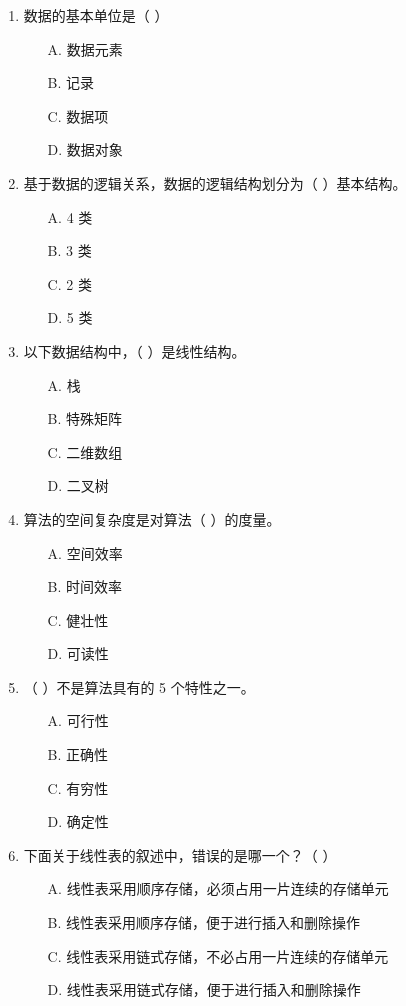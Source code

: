 \documentclass[12pt, a4paper]{article}
\begin{document}
\begin{enumerate}[label=\arabic*.]
	\item 数据的基本单位是（ ）
	      \begin{enumerate}
		      \item[A.] 数据元素
		      \item[B.] 记录
		      \item[C.] 数据项
		      \item[D.] 数据对象
	      \end{enumerate}

	\item 基于数据的逻辑关系，数据的逻辑结构划分为（ ）基本结构。
	      \begin{enumerate}
		      \item[A.] 4 类
		      \item[B.] 3 类
		      \item[C.] 2 类
		      \item[D.] 5 类
	      \end{enumerate}

	\item 以下数据结构中，（ ）是线性结构。
	      \begin{enumerate}
		      \item[A.] 栈
		      \item[B.] 特殊矩阵
		      \item[C.] 二维数组
		      \item[D.] 二叉树
	      \end{enumerate}

	\item 算法的空间复杂度是对算法（ ）的度量。
	      \begin{enumerate}
		      \item[A.] 空间效率
		      \item[B.] 时间效率
		      \item[C.] 健壮性
		      \item[D.] 可读性
	      \end{enumerate}

	\item （ ）不是算法具有的 5 个特性之一。
	      \begin{enumerate}
		      \item[A.] 可行性
		      \item[B.] 正确性
		      \item[C.] 有穷性
		      \item[D.] 确定性
	      \end{enumerate}

	\item 下面关于线性表的叙述中，错误的是哪一个？（ ）
	      \begin{enumerate}
		      \item[A.] 线性表采用顺序存储，必须占用一片连续的存储单元
		      \item[B.] 线性表采用顺序存储，便于进行插入和删除操作
		      \item[C.] 线性表采用链式存储，不必占用一片连续的存储单元
		      \item[D.] 线性表采用链式存储，便于进行插入和删除操作
	      \end{enumerate}


\end{enumerate}
\end{document}
